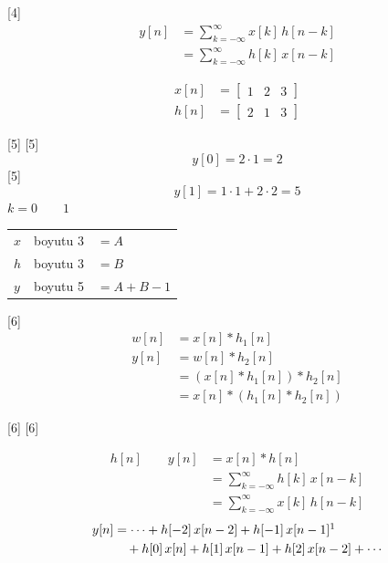 \documentclass[11pt,a4paper]{article}
\begin{document}
[4]
\begin{align*}
y[n] &= \sum_{k=-\infty}^{\infty} x[k]\,h[n-k]\\
&= \sum_{k=-\infty}^{\infty} h[k]\,x[n-k]
\end{align*}

\begin{align*}
x[n] &= \begin{bmatrix} 1 & 2 & 3 \end{bmatrix}\\
h[n] &= \begin{bmatrix} 2 & 1 & 3 \end{bmatrix}
\end{align*}

[5]
[5]
\[ y[0]=2\cdot 1=2 \]
[5]
\[ y[1]=1\cdot 1+2\cdot 2=5 \]
$k=0 \qquad 1$

\begin{tabular}{@{}l@{\qquad}l@{\qquad}l@{}}
$x$ & boyutu 3 & $= A$\\
$h$ & boyutu 3 & $= B$\\
$y$ & boyutu 5 & $= A+B-1$
\end{tabular}

[6]
\begin{align*}
w[n] &= x[n]*h_1[n]\\
y[n] &= w[n]*h_2[n]\\
&= (x[n]*h_1[n])*h_2[n]\\
&= x[n]*(h_1[n]*h_2[n])
\end{align*}

[6]
[6]

\begin{align*}
h[n] \qquad y[n] &= x[n]*h[n]\\
&= \sum_{k=-\infty}^{\infty} h[k]\,x[n-k]\\
&= \sum_{k=-\infty}^{\infty} x[k]\,h[n-k]
\end{align*}
\begin{align*}
y[n] &= \cdots + h[-2]\,x[n-2] + h[-1]\,x[n-1]\footnotemark\\
&\quad + h[0]\,x[n] + h[1]\,x[n-1] + h[2]\,x[n-2] + \cdots
\end{align*}
\end{document}
